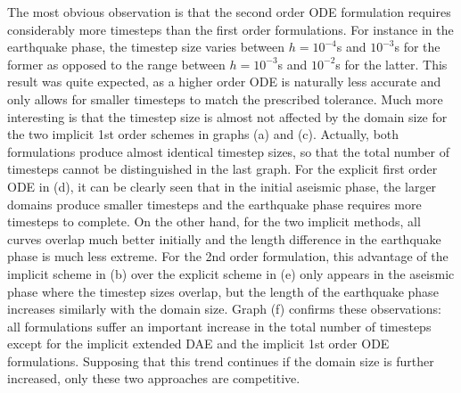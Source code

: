 The most obvious observation is that the second order ODE formulation requires considerably more timesteps than the first order formulations. For instance in the earthquake phase, the timestep size varies between $h=10^{-4}$s and $10^{-3}$s for the former as opposed to the range between $h=10^{-3}$s and $10^{-2}$s for the latter. This result was quite expected, as a higher order ODE is naturally less accurate and only allows for smaller timesteps to match the prescribed tolerance. Much more interesting is that the timestep size is almost not affected by the domain size for the two implicit 1st order schemes in graphs (a) and (c). Actually, both formulations produce almost identical timestep sizes, so that the total number of timesteps cannot be distinguished in the last graph. For the explicit first order ODE in (d), it can be clearly seen that in the initial aseismic phase, the larger domains produce smaller timesteps and the earthquake phase requires more timesteps to complete. On the other hand, for the two implicit methods, all curves overlap much better initially and the length difference in the earthquake phase is much less extreme. For the 2nd order formulation, this advantage of the implicit scheme in (b) over the explicit scheme in (e) only appears in the aseismic phase where the timestep sizes overlap, but the length of the earthquake phase increases similarly with the domain size. Graph (f) confirms these observations: all formulations suffer an important increase in the total number of timesteps except for the implicit extended DAE and the implicit 1st order ODE formulations. Supposing that this trend continues if the domain size is further increased, only these two approaches are competitive.


